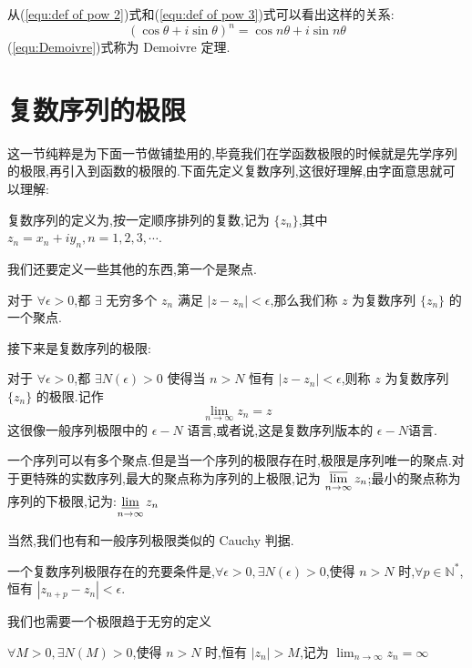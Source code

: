 \documentclass[UTF8]{ctexbook}
\begin{document}
从(\ref{equ:def of pow 2})式和(\ref{equ:def of pow 3})式可以看出这样的关系:
\begin{equation}
    (\cos\theta+i\sin\theta)^n = \cos n\theta +i\sin n\theta
    \label{equ:Demoivre}
\end{equation}
(\ref{equ:Demoivre})式称为 Demoivre 定理.

\section{复数序列的极限}

这一节纯粹是为下面一节做铺垫用的,毕竟我们在学函数极限的时候就是先学序列的极限,再引入到函数的极限的.下面先定义复数序列,这很好理解,由字面意思就可以理解:

\begin{definition}
    复数序列的定义为,按一定顺序排列的复数,记为 $\{z_n\}$,其中 $z_n=x_n+iy_n,n=1,2,3,\cdots$.
\end{definition}

我们还要定义一些其他的东西,第一个是聚点.
\begin{definition}
    对于 $\forall \epsilon>0$,都 $\exists$ 无穷多个 $z_n$ 满足 $|z-z_n| < \epsilon$,那么我们称 $z$ 为复数序列 $\{z_n\}$ 的一个聚点.
\end{definition}
接下来是复数序列的极限:
\begin{definition}
    对于 $\forall \epsilon>0$,都 $\exists N(\epsilon) > 0$ 使得当 $n>N$ 恒有 $|z-z_n| < \epsilon$,则称 $z$ 为复数序列 $\{z_n\}$ 的极限.记作
    \[
        \lim_{n\to\infty}z_n=z
    \]
    这很像一般序列极限中的 $\epsilon-N$ 语言,或者说,这是复数序列版本的 $\epsilon-N$语言.
\end{definition}

一个序列可以有多个聚点.但是当一个序列的极限存在时,极限是序列唯一的聚点.对于更特殊的实数序列,最大的聚点称为序列的上极限,记为 $\displaystyle\varlimsup_{n\to\infty}  z_n$;最小的聚点称为序列的下极限,记为:$\displaystyle\varliminf _{n\to\infty} z_n$

当然,我们也有和一般序列极限类似的 Cauchy 判据.
\begin{theorem}
    一个复数序列极限存在的充要条件是,$\forall\epsilon > 0,\exists N(\epsilon) > 0$,使得 $n>N$ 时,$\forall p\in \mathbb{N}^{*}$,恒有 $|z_{n+p}-z_n|<\epsilon$.
\end{theorem}

我们也需要一个极限趋于无穷的定义
\begin{definition}
    $\forall M>0,\exists N(M)>0$,使得 $n>N$ 时,恒有 $|z_n|>M$,记为 $\displaystyle \lim_{n\to\infty} z_n=\infty$
\end{definition}
\end{document}
